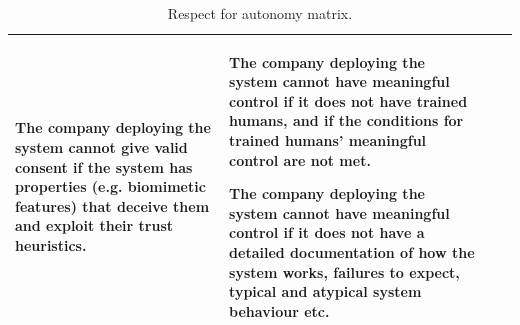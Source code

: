 \documentclass[lettersize,journal]{IEEEtran}
\begin{document}
\begin{landscape}
\begin{table}[]
\begin{tabular}{|p{0.10\textheight}|p{0.35\textheight}|p{0.35\textheight}|p{0.35\textheight}|}
The company deploying the system cannot give valid consent if the system has properties (e.g. biomimetic features) that deceive them and exploit their trust heuristics. &  The company deploying the system cannot have meaningful control if it does not have trained humans, and if the conditions for trained humans’ meaningful control are not met.

The company deploying the system cannot have meaningful control if it does not have a detailed documentation of how the system works, failures to expect, typical and atypical system behaviour etc.\\ \hline 
\end{tabular}
\caption{\label{tab:autonomy}Respect for autonomy matrix.}
\end{table}

\end{landscape}
\end{document}
